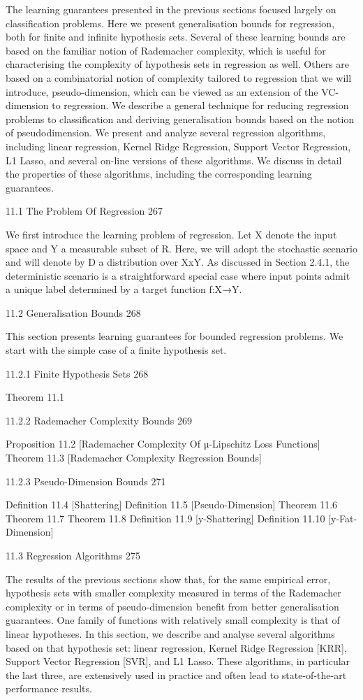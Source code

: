 The learning guarantees presented in the previous sections focused largely on classification problems. Here we present generalisation bounds for regression, both for finite and infinite hypothesis sets. Several of these learning bounds are based on the familiar notion of Rademacher complexity, which is useful for characterising the complexity of hypothesis sets in regression as well. Others are based on a combinatorial notion of complexity tailored to regression that we will introduce, pseudo-dimension, which can be viewed as an extension of the VC-dimension to regression. We describe a general technique for reducing regression problems to classification and deriving generalisation bounds based on the notion of pseudodimension. We present and analyze several regression algorithms, including linear regression, Kernel Ridge Regression, Support Vector Regression, L1 Lasso, and several on-line versions of these algorithms. We discuss in detail the properties of these algorithms, including the corresponding learning guarantees.

11.1 The Problem Of Regression 267

We first introduce the learning problem of regression. Let X denote the input space and Y a measurable subset of R. Here, we will adopt the stochastic scenario and will denote by D a distribution over XxY. As discussed in Section 2.4.1, the deterministic scenario is a straightforward special case where input points admit a unique label determined by a target function f:X→Y.

11.2 Generalisation Bounds 268

This section presents learning guarantees for bounded regression problems. We start with the simple case of a finite hypothesis set.

11.2.1 Finite Hypothesis Sets 268

Theorem 11.1

11.2.2 Rademacher Complexity Bounds 269

Proposition 11.2 [Rademacher Complexity Of µ-Lipschitz Loss Functions]
Theorem 11.3 [Rademacher Complexity Regression Bounds]

11.2.3 Pseudo-Dimension Bounds 271

Definition 11.4 [Shattering]
Definition 11.5 [Pseudo-Dimension]
Theorem 11.6
Theorem 11.7
Theorem 11.8
Definition 11.9 [y-Shattering]
Definition 11.10 [y-Fat-Dimension]

11.3 Regression Algorithms 275

The results of the previous sections show that, for the same empirical error, hypothesis sets with smaller complexity measured in terms of the Rademacher complexity or in terms of pseudo-dimension benefit from better generalisation guarantees. One family of functions with relatively small complexity is that of linear hypotheses. In this section, we describe and analyse several algorithms based on that hypothesis set: linear regression, Kernel Ridge Regression [KRR], Support Vector Regression [SVR], and L1 Lasso. These algorithms, in particular the last three, are extensively used in practice and often lead to state-of-the-art performance results.

